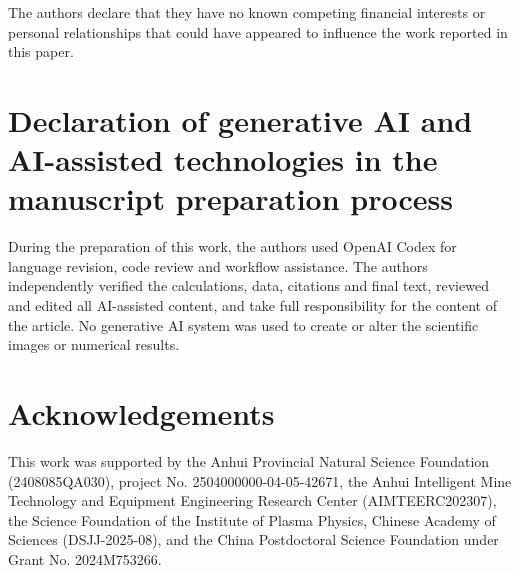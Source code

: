\documentclass[preprint,12pt]{elsarticle}
\begin{document}
The authors declare that they have no known competing financial interests or personal relationships that could have appeared to influence the work reported in this paper.

\section*{Declaration of generative AI and AI-assisted technologies in the manuscript preparation process}

During the preparation of this work, the authors used OpenAI Codex for language revision, code review and workflow assistance. The authors independently verified the calculations, data, citations and final text, reviewed and edited all AI-assisted content, and take full responsibility for the content of the article. No generative AI system was used to create or alter the scientific images or numerical results.

\section*{Acknowledgements}

This work was supported by the Anhui Provincial Natural Science Foundation (2408085QA030), project No. 2504000000-04-05-42671, the Anhui Intelligent Mine Technology and Equipment Engineering Research Center (AIMTEERC202307), the Science Foundation of the Institute of Plasma Physics, Chinese Academy of Sciences (DSJJ-2025-08), and the China Postdoctoral Science Foundation under Grant No. 2024M753266.

\begingroup
\small


\endgroup
\end{document}
